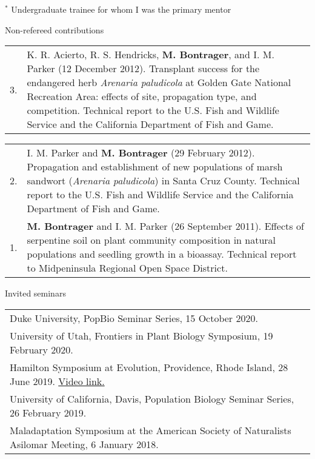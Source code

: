 \documentclass[letterpaper,11pt,oneside]{article}
\begin{document}
\smallskip
\noindent $^{*}$ Undergraduate trainee for whom I was the primary mentor

\bigskip
\bigskip
\smallskip




\noindent\Large{Non-refereed contributions}  
\normalsize
\bigskip

\def\arraystretch{1.4}
\noindent \begin{tabular}{@{} p{0.5cm} >{\raggedright\arraybackslash}p{16.7cm}}
3. & K. R. Acierto, R. S. Hendricks, \textbf{M. Bontrager}, and I. M. Parker (12 December 2012). Transplant success for the endangered herb \textit{Arenaria paludicola} at Golden Gate National Recreation Area: effects of site, propagation type, and competition. Technical report to the U.S. Fish and Wildlife Service and the California Department of Fish and Game. \\
\end{tabular}

\def\arraystretch{1.4}
\noindent \begin{tabular}{@{} p{0.5cm} >{\raggedright\arraybackslash}p{16.7cm}}
2. & I. M. Parker and \textbf{M. Bontrager} (29 February 2012). Propagation and establishment of new populations of marsh sandwort (\textit{Arenaria paludicola}) in Santa Cruz County. Technical report to the U.S. Fish and Wildlife Service and the California Department of Fish and Game. \\
1. & \textbf{M. Bontrager} and I. M. Parker (26 September 2011). Effects of serpentine soil on plant community composition in natural populations and seedling growth in a bioassay. Technical report to Midpeninsula Regional Open Space District. \\
\end{tabular}

\bigskip
\bigskip
\smallskip




\noindent\Large{Invited seminars} 

\normalsize
\bigskip

\def\arraystretch{1.3}
\noindent \begin{tabular}{@{} >{\raggedright\arraybackslash}p{17.2cm}}
Duke University, PopBio Seminar Series, 15 October 2020.\\
University of Utah, Frontiers in Plant Biology Symposium, 19 February 2020.\\
Hamilton Symposium at Evolution, Providence, Rhode Island, 28 June 2019. \href{https://www.youtube.com/watch?v=UeK_zYEfVyA}{Video link.} \\
University of California, Davis, Population Biology Seminar Series, 26 February 2019. \\
Maladaptation Symposium at the American Society of Naturalists Asilomar Meeting, 6 January 2018.
\end{tabular}
\bigskip
\bigskip
\smallskip
\end{document}
